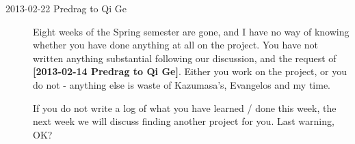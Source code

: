 \begin{description}
\item[2013-02-22 Predrag to Qi Ge] Eight weeks of the Spring semester
are gone, and I have no way of knowing whether you have done anything
at all on the project. You have not written anything substantial
following our discussion, and the request  of {\bf [2013-02-14
Predrag to Qi Ge]}. Either you work on the project, or you do not -
anything else is waste of Kazumasa's, Evangelos and my time.

If you do not write a log of what you have learned / done this week,
the next week we will discuss finding another project for you. Last
warning, OK?


\end{description}

\renewcommand{\ssp}{a}
